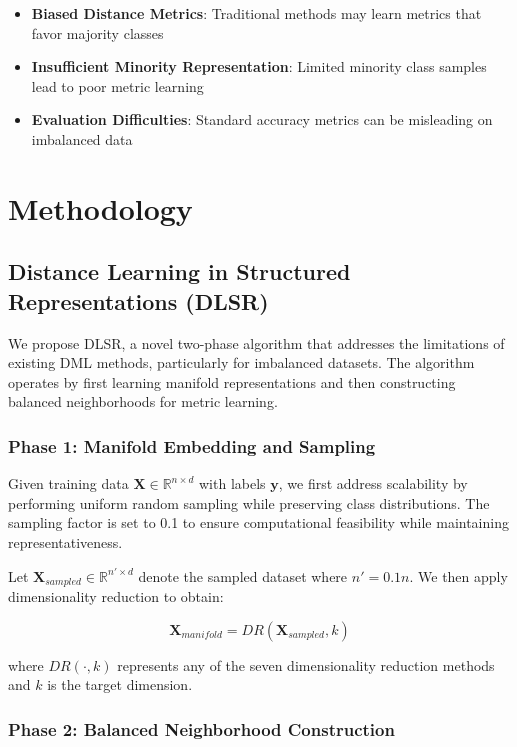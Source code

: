 \documentclass[review]{elsarticle}
\begin{document}
\begin{itemize}
\item \textbf{Biased Distance Metrics}: Traditional methods may learn metrics that favor majority classes
\item \textbf{Insufficient Minority Representation}: Limited minority class samples lead to poor metric learning
\item \textbf{Evaluation Difficulties}: Standard accuracy metrics can be misleading on imbalanced data
\end{itemize}

\section{Methodology}
\label{sec:methodology}

\subsection{Distance Learning in Structured Representations (DLSR)}

We propose DLSR, a novel two-phase algorithm that addresses the limitations of existing DML methods, particularly for imbalanced datasets. The algorithm operates by first learning manifold representations and then constructing balanced neighborhoods for metric learning.

\subsubsection{Phase 1: Manifold Embedding and Sampling}

Given training data $\mathbf{X} \in \mathbb{R}^{n \times d}$ with labels $\mathbf{y}$, we first address scalability by performing uniform random sampling while preserving class distributions. The sampling factor is set to 0.1 to ensure computational feasibility while maintaining representativeness.

Let $\mathbf{X}_{sampled} \in \mathbb{R}^{n' \times d}$ denote the sampled dataset where $n' = 0.1n$. We then apply dimensionality reduction to obtain:

\begin{equation}
\mathbf{X}_{manifold} = DR(\mathbf{X}_{sampled}, k)
\end{equation}

where $DR(\cdot, k)$ represents any of the seven dimensionality reduction methods and $k$ is the target dimension.

\subsubsection{Phase 2: Balanced Neighborhood Construction}
\end{document}
